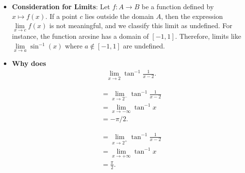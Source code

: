 \documentclass{report}
\begin{document}
\begin{itemize}
        \item \textbf{Consideration for Limits}: Let \(f: A \rightarrow B\) be a function defined by \(x \mapsto f(x)\). If a point \(c\) lies outside the domain \(A\), then the expression \(\lim\limits_{x \to c} f(x)\) is not meaningful, and we classify this limit as undefined. For instance, the function arcsine has a domain of \([-1,1]\). Therefore, limits like \(\lim\limits_{x \to a} \sin^{-1}(x)\) where \(a \notin [-1,1]\) are undefined.
        \item \textbf{Why does}
            \begin{align*}
            &\lim\limits_{x \to 2}{\tan^{-1}{\frac{1}{x-2}}} 
        .\end{align*}
        \begin{minipage}[]{0.47\textwidth}
            \begin{align*}
                &=\lim\limits_{x \to 2^{-}}{\tan^{-1}{\frac{1}{x-2}}} \\
                &= \lim\limits_{x \to -\infty}{\tan^{-1}{x}} \\
                &= -\pi/2
            .\end{align*}
        \end{minipage}
        \begin{minipage}[]{0.47\textwidth}
            \begin{align*}
                &=\lim\limits_{x \to 2^{+}}{\tan^{-1}{\frac{1}{x-2}}} \\
                &=\lim\limits_{x \to +\infty}{\tan^{-1}{x}} \\
                &=\frac{\pi}{2}
            .\end{align*}
        \end{minipage}
\end{itemize}
\end{document}
